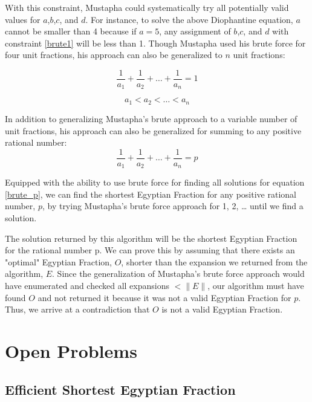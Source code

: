 \documentclass[paper=a4, fontsize=11pt]{scrartcl}
\numberwithin{equation}{section}	 %
\numberwithin{figure}{section}	 %
\numberwithin{table}{section}	 %
\begin{document}
With this constraint, Mustapha could systematically try all potentially valid values for $a$,$b$,$c$, and $d$. For instance, to solve the above Diophantine equation, $a$ cannot be smaller than 4 because if $a=5$, any assignment of $b$,$c$, and $d$ with constraint \ref{brute1} will be less than 1. Though Mustapha used his brute force for four unit fractions, his approach can also be generalized to $n$ unit fractions:

\begin{equation}
	\frac{1}{a_1} + \frac{1}{a_2} + \ldots + \frac{1}{a_n} = 1
\end{equation}

\begin{equation}\label{brute2}
	a_1 < a_2 < \ldots < a_n
\end{equation}

In addition to generalizing Mustapha’s brute approach to a variable number of unit fractions, his approach can also be generalized for summing to any positive rational number:
\begin{equation}\label{brute_p}
	\frac{1}{a_1} + \frac{1}{a_2} + \ldots + \frac{1}{a_n} = p
\end{equation}

Equipped with the ability to use brute force for finding all solutions for equation \ref{brute_p}, we can find the shortest Egyptian Fraction for any positive rational number, $p$, by trying Mustapha’s brute force approach for 1, 2, … until we find a solution.

The solution returned by this algorithm will be the shortest Egyptian Fraction for the rational number p. We can prove this by assuming that there exists an "optimal" Egyptian Fraction, $O$, shorter than the expansion we returned from the algorithm, $E$. Since the generalization of Mustapha’s brute force approach would have enumerated and checked all expansions $< \|E\|$, our algorithm must have found $O$ and not returned it because it was not a valid Egyptian Fraction for $p$. Thus, we arrive at a contradiction that $O$ is not a valid Egyptian Fraction. 

\section{Open Problems}
\subsection{Efficient Shortest Egyptian Fraction}
\end{document}
